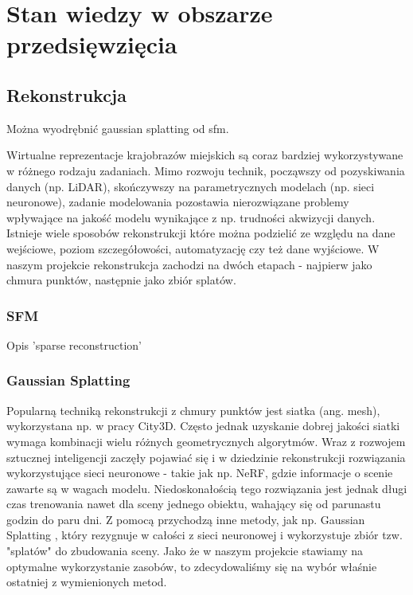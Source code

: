 \section{Stan wiedzy w obszarze przedsięwzięcia}



\subsection{Rekonstrukcja}
Można wyodrębnić gaussian splatting od sfm.

Wirtualne reprezentacje krajobrazów miejskich są coraz bardziej wykorzystywane w różnego rodzaju zadaniach. Mimo rozwoju technik, począwszy od pozyskiwania danych (np. LiDAR), skończywszy na parametrycznych modelach (np. sieci neuronowe), zadanie modelowania pozostawia nierozwiązane problemy wpływające na jakość modelu wynikające z np. trudności akwizycji danych. 
Istnieje wiele sposobów rekonstrukcji które można podzielić ze względu na dane wejściowe, poziom szczegółowości, automatyzację czy też dane wyjściowe. W naszym projekcie rekonstrukcja zachodzi na dwóch etapach - najpierw jako chmura punktów, następnie jako zbiór splatów. 

\subsubsection{SFM}
Opis 'sparse reconstruction'

\subsubsection{Gaussian Splatting}

Popularną techniką rekonstrukcji z chmury punktów jest siatka (ang. mesh), wykorzystana np. w pracy City3D\cite{city3D}. Często jednak uzyskanie dobrej jakości siatki wymaga kombinacji wielu różnych geometrycznych algorytmów. Wraz z rozwojem sztucznej inteligencji zaczęły pojawiać się i w dziedzinie rekonstrukcji rozwiązania wykorzystujące sieci neuronowe - takie jak np. NeRF\cite{nerf}, gdzie informacje o scenie zawarte są w wagach modelu. Niedoskonałością tego rozwiązania jest jednak długi czas trenowania nawet dla sceny jednego obiektu, wahający się od parunastu godzin do paru dni. Z pomocą przychodzą inne metody, jak np. Gaussian Splatting \cite{gaussiansplatting}, który rezygnuje w całości z sieci neuronowej i wykorzystuje zbiór tzw. "splatów" do zbudowania sceny. Jako że w naszym projekcie stawiamy na optymalne wykorzystanie zasobów, to zdecydowaliśmy się na wybór właśnie ostatniej z wymienionych metod. 

